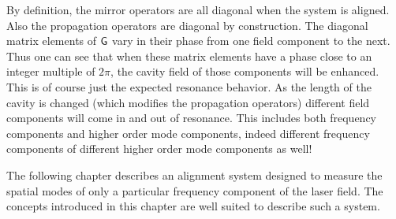By definition, the mirror operators are all diagonal when the system is aligned. %
Also the propagation operators are diagonal by construction. %
The diagonal matrix elements of $\mathsf{G}$ vary in their phase from one field component to the next. %
Thus one can see that when these matrix elements have a phase close to an integer multiple of $2\pi$, the cavity field of those components will be enhanced. %
This is of course just the expected resonance behavior. %
As the length of the cavity is changed (which modifies the propagation operators) different field components will come in and out of resonance. %
This includes both frequency components and higher order mode components, indeed different frequency components of different higher order mode components as well!

The following chapter describes an alignment system designed to measure the spatial modes of only a particular frequency component of the laser field. %
The concepts introduced in this chapter are well suited to describe such a system.